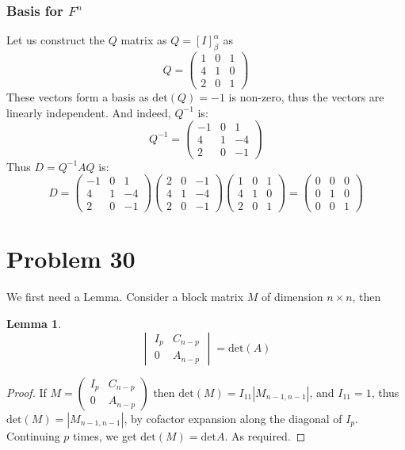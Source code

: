 \documentclass{article}[12pt]
\newtheorem{lem}{Lemma}
\begin{document}
\subsubsection{Basis for $F^n$}
Let us construct the $Q$ matrix as $Q=[I]_\beta^\alpha$ as
\[
Q = \begin{pmatrix} 1 & 0 & 1 \\ 4 & 1 & 0 \\ 2 & 0 & 1 \end{pmatrix}
\]
These vectors form a basis as $\textrm{det}(Q)=-1$ is non-zero, thus
the vectors are linearly independent. And indeed, $Q^{-1}$ is:
\[
Q^{-1} = \begin{pmatrix} -1 & 0 & 1\\4 & 1 & -4 \\ 2 & 0 & -1 \end{pmatrix}
\]
Thus $D=Q^{-1}AQ$ is:
\[
D = \begin{pmatrix} -1 & 0 & 1\\4 & 1 & -4 \\ 2 & 0 & -1 \end{pmatrix}
\begin{pmatrix} 2 & 0 & -1 \\ 4 & 1 & -4 \\ 2 & 0 & -1 \end{pmatrix}
\begin{pmatrix} 1 & 0 & 1 \\ 4 & 1 & 0 \\ 2 & 0 & 1 \end{pmatrix}=
\begin{pmatrix}
0 & 0 & 0\\
0 & 1 & 0\\
0 & 0 & 1
\end{pmatrix}
\]
\section{Problem 30}
We first need a Lemma.
Consider a block matrix $M$ of dimension $n\times n$, then
\begin{lem}
\[
\begin{vmatrix}
I_p & C_{n-p} \\
0 & A_{n-p}
\end{vmatrix} = \textrm{det}(A)
\]
\end{lem}
\begin{proof}
If $M=\begin{pmatrix} I_p & C_{n-p} \\ 0 & A_{n-p} \end{pmatrix}$ then
$\textrm{det}(M)=I_{11}|M_{n-1,n-1}|$, and $I_{11}=1$, thus
$\textrm{det}(M)=|M_{n-1,n-1}|$, by cofactor expansion along the diagonal of
$I_{p}$. Continuing $p$ times, we get $\textrm{det}(M)=\textrm{det}A$. As
required.
\end{proof}
\end{document}
